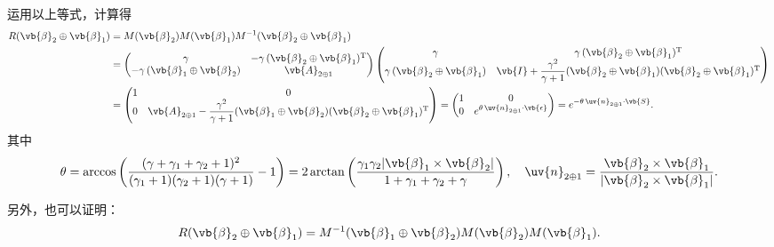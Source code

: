 运用以上等式，计算得
\begin{align*}
	R(\vb{\beta}_2 \oplus \vb{\beta}_1) & = M(\vb{\beta}_2) M(\vb{\beta}_1) M^{-1}(\vb{\beta}_2 \oplus \vb{\beta}_1) \\&=
	\begin{pmatrix}
		\gamma                                        & -\gamma \, (\vb{\beta}_2 \oplus \vb{\beta}_1)^\mathrm{T} \\
		-\gamma \, (\vb{\beta}_1 \oplus \vb{\beta}_2) & \vb{A}_{2 \oplus 1}
	\end{pmatrix}
	\begin{pmatrix}
		\gamma                                       & \gamma \, (\vb{\beta}_2 \oplus \vb{\beta}_1)^\mathrm{T}                                                               \\
		\gamma \, (\vb{\beta}_2 \oplus \vb{\beta}_1) & \vb{I} + \dfrac{\gamma^2}{\gamma + 1} (\vb{\beta}_2 \oplus \vb{\beta}_1)(\vb{\beta}_2 \oplus \vb{\beta}_1)^\mathrm{T}
	\end{pmatrix}
	\\&=
	\begin{pmatrix}
		1 & 0                                                                                                                                  \\
		0 & \vb{A}_{2 \oplus 1} - \dfrac{\gamma^2}{\gamma + 1} (\vb{\beta}_1 \oplus \vb{\beta}_2)(\vb{\beta}_2 \oplus \vb{\beta}_1)^\mathrm{T}
	\end{pmatrix} =
	\begin{pmatrix}
		1 & 0                                                     \\
		0 & e^{\theta \, \uv{n}_{2 \oplus 1} \cdot \vb{\epsilon}}
	\end{pmatrix} = e^{-\theta \, \uv{n}_{2 \oplus 1} \cdot \vb{S}}.
\end{align*}
其中
\begin{align*}
	\theta = \arccos\left( \dfrac{(\gamma + \gamma_1 + \gamma_2 + 1)^2}{(\gamma_1 + 1)(\gamma_2 + 1)(\gamma + 1)} - 1 \right) = 2 \arctan\left( \dfrac{\gamma_1 \gamma_2 |\vb{\beta}_1 \times \vb{\beta}_2|}{1 + \gamma_1 + \gamma_2 + \gamma} \right),\quad
	\uv{n}_{2 \oplus 1} = \dfrac{\vb{\beta}_2 \times \vb{\beta}_1}{|\vb{\beta}_2 \times \vb{\beta}_1|}.
\end{align*}

另外，也可以证明：
\begin{align*}
	R(\vb{\beta}_2 \oplus \vb{\beta}_1) = M^{-1}(\vb{\beta}_1 \oplus \vb{\beta}_2) M(\vb{\beta}_2) M(\vb{\beta}_1).
\end{align*}

